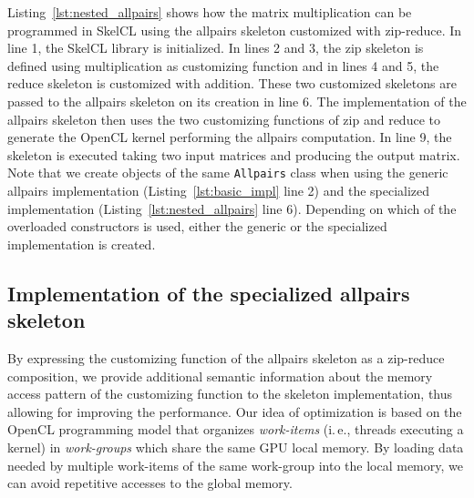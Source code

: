 Listing~\ref{lst:nested_allpairs} shows how the matrix multiplication can be programmed in SkelCL using the allpairs skeleton customized with zip-reduce.
In line 1, the SkelCL library is initialized.
In lines 2 and 3, the zip skeleton is defined using multiplication as customizing function and in lines 4 and 5, the reduce skeleton is customized with addition.
These two customized skeletons are passed to the allpairs skeleton on its creation in line 6.
The implementation of the allpairs skeleton then uses the two customizing functions of zip and reduce to generate the OpenCL kernel performing the allpairs computation.
In line 9, the skeleton is executed taking two input matrices and producing the output matrix.
Note that we create objects of the same \texttt{Allpairs} class when using the generic allpairs implementation (Listing~\ref{lst:basic_impl} line 2) and the specialized implementation (Listing~\ref{lst:nested_allpairs} line 6).
Depending on which of the overloaded constructors is used, either the generic or the specialized implementation is created.

\subsection{Implementation of the specialized allpairs skeleton}
By expressing the customizing function of the allpairs skeleton as a zip-reduce composition, we provide additional semantic information about the memory access pattern of the customizing function to the skeleton implementation, thus allowing for improving the performance.
Our idea of optimization is based on the OpenCL programming model that organizes \emph{work-items} (i.\,e., threads executing a kernel) in \emph{work-groups} which share the same GPU local memory.
By loading data needed by multiple work-items of the same work-group into the local memory, we can avoid repetitive accesses to the global memory.

